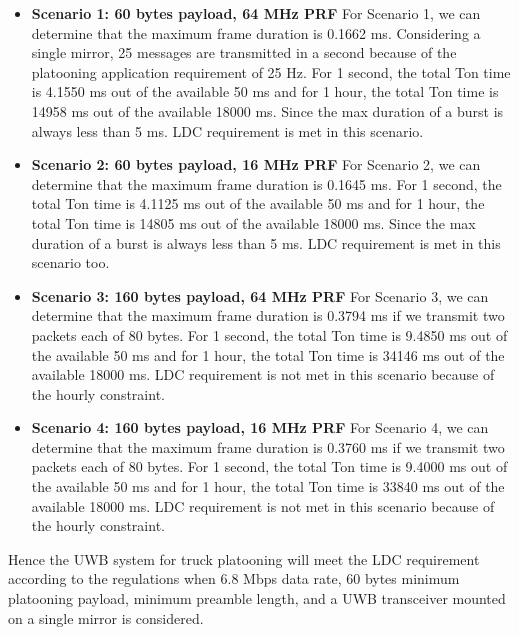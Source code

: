 \begin{itemize}
    \item \textbf{Scenario 1: 60 bytes payload, 64 MHz PRF} For Scenario 1, we can determine that the maximum frame duration is 0.1662 ms. Considering a single mirror, 25  messages are transmitted in a second because of the platooning application requirement of 25 Hz. For 1 second, the total Ton time is 4.1550 ms out of the available 50 ms and for 1 hour, the total Ton time is 14958 ms out of the available 18000 ms. Since the max duration of a burst is always less than 5 ms. LDC requirement is met in this scenario. 
    
    \item \textbf{Scenario 2: 60 bytes payload, 16 MHz PRF} For Scenario 2, we can determine that the maximum frame duration is 0.1645 ms. For 1 second, the total Ton time is 4.1125 ms out of the available 50 ms and for 1 hour, the total Ton time is 14805 ms out of the available 18000 ms. Since the max duration of a burst is always less than 5 ms. LDC requirement is met in this scenario too. 
    
    \item \textbf{Scenario 3: 160 bytes payload, 64 MHz PRF} For Scenario 3, we can determine that the maximum frame duration is 0.3794 ms if we transmit two packets each of 80 bytes. For 1 second, the total Ton time is 9.4850 ms out of the available 50 ms and for 1 hour, the total Ton time is 34146 ms out of the available 18000 ms. LDC requirement is not met in this scenario because of the hourly constraint. 
    
    \item \textbf{Scenario 4: 160 bytes payload, 16 MHz PRF} For Scenario 4, we can determine that the maximum frame duration is 0.3760 ms if we transmit two packets each of 80 bytes. For 1 second, the total Ton time is 9.4000 ms out of the available 50 ms and for 1 hour, the total Ton time is 33840 ms out of the available 18000 ms. LDC requirement is not met in this scenario because of the hourly constraint. 
    
\end{itemize}

Hence the UWB system for truck platooning will meet the LDC requirement according to the regulations when 6.8 Mbps data rate, 60 bytes minimum platooning payload, minimum preamble length, and a UWB transceiver mounted on a single mirror is considered. 

